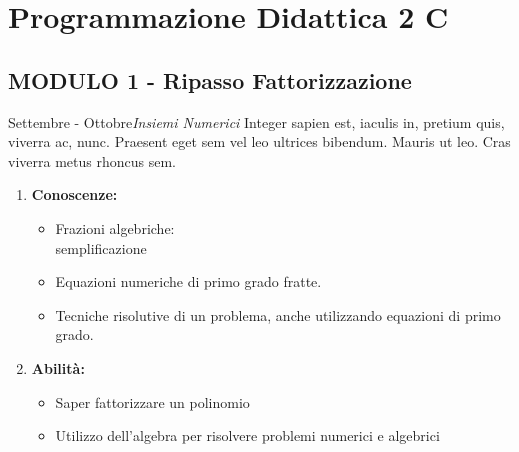 \documentclass[10pt, a4paper twoside, notitlepage, notoc, justified]{tufte-handout}
\begin{document}

\newpage
\section{Programmazione Didattica 2 C}
\subsection{\small \bf MODULO 1 - Ripasso Fattorizzazione}

\begin{loggentry}{Settembre - Ottobre}{\em Insiemi Numerici}
Integer sapien est, iaculis in, pretium quis, viverra ac, nunc. Praesent eget sem vel leo ultrices bibendum. Mauris ut leo. Cras viverra metus rhoncus sem.

\begin{multicols}{2}
{\small
	\begin{enumerate}
		\item {\bf Conoscenze:}
		\begin{itemize}
			\item Frazioni algebriche:\\ semplificazione
			\item Equazioni numeriche di primo grado fratte.
			\item Tecniche risolutive di un problema, anche utilizzando equazioni di primo grado.
			\end{itemize}
		\item {\bf Abilità:}
		\begin{itemize}
			\item Saper fattorizzare un polinomio
			\item Utilizzo dell'algebra per risolvere problemi numerici e algebrici
			\end{itemize}
	\end{enumerate} 

\columnbreak

}
\end{multicols}
\end{loggentry}
\end{document}

